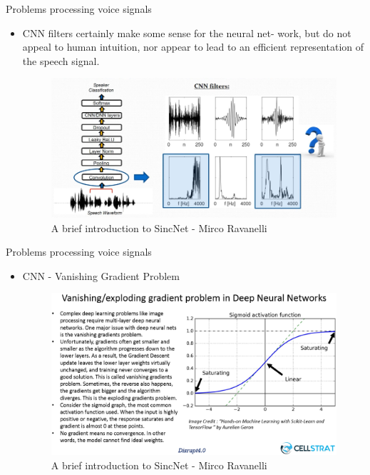 \documentclass[11pt]{beamer}
\begin{document}
\begin{frame}{Problems processing voice signals}
	\begin{itemize}
		\item CNN filters certainly make some sense for the neural net-
		work, but do not appeal to human intuition, nor appear to lead
		to an efficient representation of the speech signal.
		\begin{figure}[H]
			\includegraphics[width=0.95\linewidth]{images/interpretability_problems.png}
			\caption{A brief introduction to SincNet - Mirco Ravanelli}
			\label{fig:writing-thesis}
		\end{figure}
	\end{itemize}
\end{frame}
\begin{frame}{Problems processing voice signals}
	\begin{itemize}
		\item CNN - Vanishing Gradient Problem
		\begin{figure}[H]
			\includegraphics[width=0.95\linewidth]{images/Vanishing-Gradients-in-DNN.png}
			\caption{A brief introduction to SincNet - Mirco Ravanelli}
			\label{fig:writing-thesis}
		\end{figure}
	\end{itemize}
\end{frame}
\end{document}
